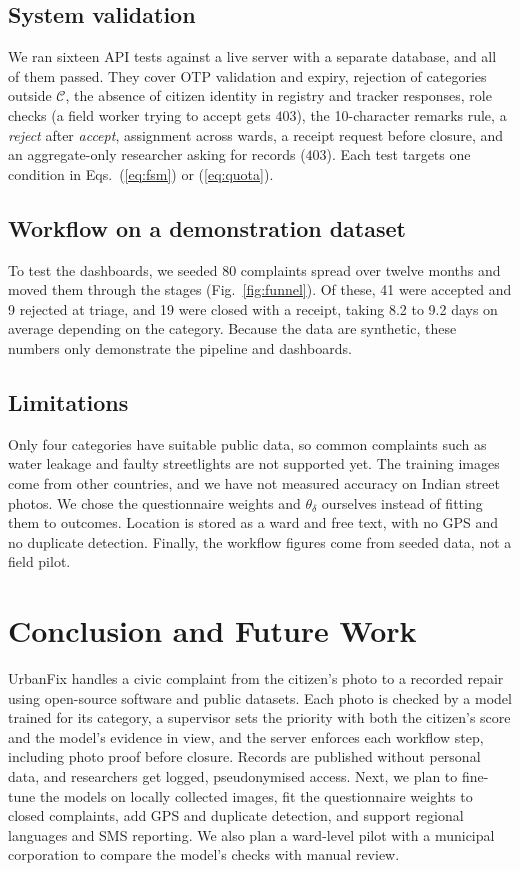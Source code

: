\documentclass[conference]{IEEEtran}
\begin{document}
\subsection{System validation}
We ran sixteen API tests against a live server with a separate database, and all of them passed. They cover OTP validation and expiry, rejection of categories outside $\mathcal{C}$, the absence of citizen identity in registry and tracker responses, role checks (a field worker trying to accept gets $403$), the 10-character remarks rule, a \textit{reject} after \textit{accept}, assignment across wards, a receipt request before closure, and an aggregate-only researcher asking for records ($403$). Each test targets one condition in Eqs.~(\ref{eq:fsm}) or (\ref{eq:quota}).

\subsection{Workflow on a demonstration dataset}
To test the dashboards, we seeded 80 complaints spread over twelve months and moved them through the stages (Fig.~\ref{fig:funnel}). Of these, 41 were accepted and 9 rejected at triage, and 19 were closed with a receipt, taking 8.2 to 9.2 days on average depending on the category. Because the data are synthetic, these numbers only demonstrate the pipeline and dashboards.



\subsection{Limitations}
Only four categories have suitable public data, so common complaints such as water leakage and faulty streetlights are not supported yet. The training images come from other countries, and we have not measured accuracy on Indian street photos. We chose the questionnaire weights and $\theta_\delta$ ourselves instead of fitting them to outcomes. Location is stored as a ward and free text, with no GPS and no duplicate detection. Finally, the workflow figures come from seeded data, not a field pilot.

\section{Conclusion and Future Work}\label{sec:conc}
UrbanFix handles a civic complaint from the citizen's photo to a recorded repair using open-source software and public datasets. Each photo is checked by a model trained for its category, a supervisor sets the priority with both the citizen's score and the model's evidence in view, and the server enforces each workflow step, including photo proof before closure. Records are published without personal data, and researchers get logged, pseudonymised access. Next, we plan to fine-tune the models on locally collected images, fit the questionnaire weights to closed complaints, add GPS and duplicate detection, and support regional languages and SMS reporting. We also plan a ward-level pilot with a municipal corporation to compare the model's checks with manual review.
\end{document}

